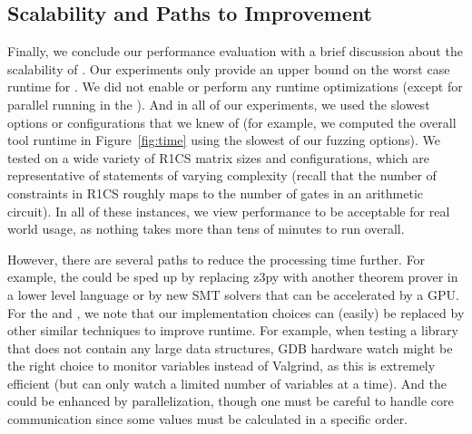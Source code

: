 
\iffalse

\subsection{Scalability and Paths to Improvement}
\label{subsec:snarkprobe-scalability}

Finally, we conclude our performance evaluation with a brief discussion about the scalability of \SnarkFuzzer.
Our experiments only provide an upper bound on the worst case runtime for \SnarkFuzzer.  We did not enable or perform any runtime optimizations (except for parallel running in the ).  And in all of our experiments, we used the slowest options or configurations that we knew of (for example, we computed the overall tool runtime in Figure~\ref{fig:time} using the slowest of our fuzzing options).  We tested on a wide variety of R1CS matrix sizes and configurations, which are representative of statements of varying complexity (recall that the number of constraints in R1CS roughly maps to the number of gates in an arithmetic circuit).  In all of these instances, we view performance to be acceptable for real world usage, as nothing takes more than tens of minutes to run overall.

However, there are several paths to reduce the processing time further.
For example, the  could be sped up by replacing z3py with another theorem prover in a lower level language or by new SMT solvers \cite{Parafrost-OsamaWB-tacas21, fpsmtgpu, osama2021gpu} that can be accelerated by a GPU.
For the  and , we note that our implementation choices can (easily) be replaced by other similar techniques to improve runtime. For example, when testing a library that does not contain any large data structures, GDB hardware watch might be the right choice to monitor variables instead of Valgrind, as this is extremely efficient (but can only watch a limited number of variables at a time). And the  could be enhanced by parallelization, though one must be careful to handle core communication since some values must be calculated in a specific order.

